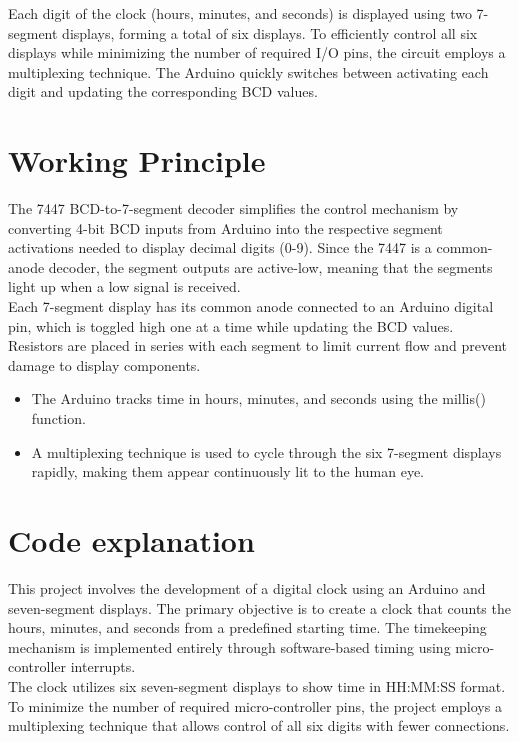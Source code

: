 \documentclass{article}
\theoremstyle{remark}
\begin{document}
Each digit of the clock (hours, minutes, and seconds) is displayed using two 7-segment displays, forming a total of six displays. To efficiently control all six displays while minimizing the number of required I/O pins, the circuit employs a multiplexing technique. The Arduino quickly switches between activating each digit and updating the corresponding BCD values.\\

\section{Working Principle}
The 7447 BCD-to-7-segment decoder simplifies the control mechanism by converting 4-bit BCD inputs from Arduino into the respective segment activations needed to display decimal digits (0-9). Since the 7447 is a common-anode decoder, the segment outputs are active-low, meaning that the segments light up when a low signal is received.\\

Each 7-segment display has its common anode connected to an Arduino digital pin, which is toggled high one at a time while updating the BCD values. Resistors are placed in series with each segment to limit current flow and prevent damage to display components.

\begin{itemize}
    \item The Arduino tracks time in hours, minutes, and seconds using the millis() function.
    \item A multiplexing technique is used to cycle through the six 7-segment displays rapidly, making them appear continuously lit to the human eye.
    
\end{itemize}

\section{Code explanation}

This project involves the development of a digital clock using an Arduino and seven-segment displays. The primary objective is to create a clock that counts the hours, minutes, and seconds from a predefined starting time. The timekeeping mechanism is implemented entirely through software-based timing using micro-controller interrupts. \\

The clock utilizes six seven-segment displays to show time in HH:MM:SS format. To minimize the number of required micro-controller pins, the project employs a multiplexing technique that allows control of all six digits with fewer connections.
\end{document}
